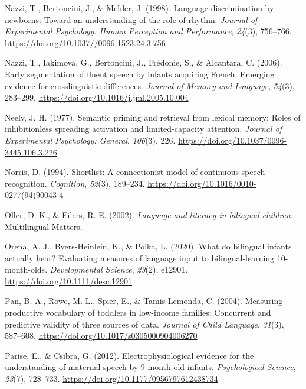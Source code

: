 \documentclass[
  12pt,
  b5paperpaper,
  twoside]{scrreprt}
\newlength{\cslhangindent}
\newlength{\cslentryspacingunit} %
\newenvironment{CSLReferences}[2] %
 {%
  \setlength{\parindent}{0pt}
  \ifodd #1
  \let\oldpar\par
  \def\par{\hangindent=\cslhangindent\oldpar}
  \fi
  \setlength{\parskip}{#2\cslentryspacingunit}
 }%
 {}
\begin{document}
\begin{CSLReferences}{1}{0}
\leavevmode{}%
Nazzi, T., Bertoncini, J., \& Mehler, J. (1998). Language discrimination
by newborns: Toward an understanding of the role of rhythm.
\emph{Journal of Experimental Psychology: Human Perception and
Performance}, \emph{24}(3), 756--766.
\url{https://doi.org/10.1037//0096-1523.24.3.756}

\leavevmode{}%
Nazzi, T., Iakimova, G., Bertoncini, J., Frédonie, S., \& Alcantara, C.
(2006). Early segmentation of fluent speech by infants acquiring
{French}: Emerging evidence for crosslinguistic differences.
\emph{Journal of Memory and Language}, \emph{54}(3), 283--299.
\url{https://doi.org/10.1016/j.jml.2005.10.004}

\leavevmode{}%
Neely, J. H. (1977). Semantic priming and retrieval from lexical memory:
Roles of inhibitionless spreading activation and limited-capacity
attention. \emph{Journal of Experimental Psychology: General},
\emph{106}(3), 226. \url{https://doi.org/10.1037/0096-3445.106.3.226}

\leavevmode{}%
Norris, D. (1994). Shortlist: A connectionist model of continuous speech
recognition. \emph{Cognition}, \emph{52}(3), 189--234.
\url{https://doi.org/10.1016/0010-0277(94)90043-4}

\leavevmode{}%
Oller, D. K., \& Eilers, R. E. (2002). \emph{Language and literacy in
bilingual children}. {Multilingual Matters}.

\leavevmode{}%
Orena, A. J., Byers-Heinlein, K., \& Polka, L. (2020). What do bilingual
infants actually hear? {Evaluating} measures of language input to
bilingual-learning 10-month-olds. \emph{Developmental Science},
\emph{23}(2), e12901. \url{https://doi.org/10.1111/desc.12901}

\leavevmode{}%
Pan, B. A., Rowe, M. L., Spier, E., \& Tamis-Lemonda, C. (2004).
Measuring productive vocabulary of toddlers in low-income families:
Concurrent and predictive validity of three sources of data.
\emph{Journal of Child Language}, \emph{31}(3), 587--608.
\url{https://doi.org/10.1017/s0305000904006270}

\leavevmode{}%
Parise, E., \& Csibra, G. (2012). Electrophysiological evidence for the
understanding of maternal speech by 9-month-old infants.
\emph{Psychological Science}, \emph{23}(7), 728--733.
\url{https://doi.org/10.1177/0956797612438734}


\end{CSLReferences}
\end{document}
